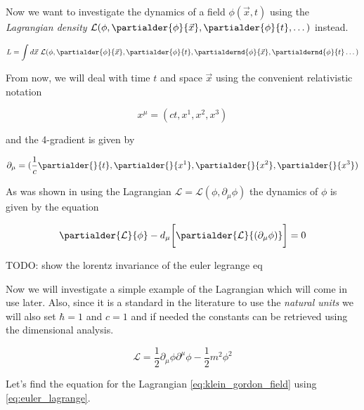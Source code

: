 Now we want to investigate the dynamics of a field $\phi(\vec{x}, t)$ using the \textit{Lagrangian density}
$\mathcal{L}(\phi, \partialder{\phi}{\vec{x}}, \partialder{\phi}{t}, \dots)$ instead.

\begin{equation}
    \label{eq:lagrangian_density}
    L = \int d\vec{x} \ \mathcal{L}(\phi, \partialder{\phi}{\vec{x}}, \partialder{\phi}{t}, \partialdernd{\phi}{\vec{x}}, \partialdernd{\phi}{t} \dots)
\end{equation}

From now, we will deal with time $t$ and space $\vec{x}$ using the convenient relativistic notation

\begin{equation*}
    x^{\mu} = (ct, x^{1}, x^{2}, x^{3})
\end{equation*}
    
and the 4-gradient is given by 

\begin{equation*}
    \partial_{\mu} = (\frac{1}{c} \partialder{}{t}, \partialder{}{x^{1}}, \partialder{}{x^{2}}, \partialder{}{x^{3}})
\end{equation*}

As was shown in \cite{goldstein} using the Lagrangian $\mathcal{L} = \mathcal{L}(\phi, \partial_{\mu} \phi)$ the dynamics of $\phi$ is given 
by the equation

\begin{equation}
    \label{eq:euler_lagrange}
    \partialder{\mathcal{L}}{\phi} - d_{\mu} \bigg[ \partialder{\mathcal{L}}{(\partial_{\mu} \phi)} \bigg] = 0
\end{equation}

TODO: show the lorentz invariance of the euler legrange eq

Now we will investigate a simple example of the Lagrangian which will come in use later. Also, since it is a standard in
the literature to use the \textit{natural units} we will also set $\hbar = 1$ and $c = 1$ and if needed the constants
can be retrieved using the dimensional analysis.

\begin{equation}
    \label{eq:klein_gordon_field}
    \mathcal{L} = \frac{1}{2} \partial_{\mu} \phi \partial^{\mu} \phi - \frac{1}{2} m^{2} \phi^{2}
\end{equation}

Let's find the equation for the Lagrangian \ref{eq:klein_gordon_field} using \ref{eq:euler_lagrange}.

